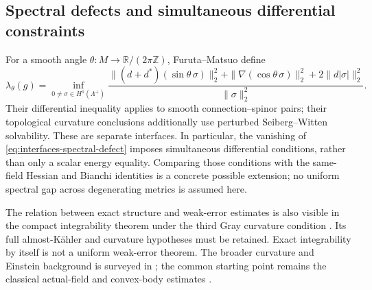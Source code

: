 \subsection{Spectral defects and simultaneous differential constraints}
For a smooth angle $\theta:M\to\mathbb R/(2\pi\mathbb Z)$,
Furuta--Matsuo define \cite[(8)]{FurutaMatsuo2016}
\begin{equation}\label{eq:interfaces-spectral-defect}
 \lambda_\theta(g)=
 \inf_{0\ne\sigma\in H^1(\Lambda^+)}
 \frac{\|(d+d^*)(\sin\theta\,\sigma)\|_2^2
       +\|\nabla(\cos\theta\,\sigma)\|_2^2
       +2\|d|\sigma|\|_2^2}{\|\sigma\|_2^2}.
\end{equation}
Their differential inequality applies to smooth connection--spinor
pairs; their topological curvature conclusions additionally use
perturbed Seiberg--Witten solvability. These are separate interfaces.
In particular, the vanishing of
\eqref{eq:interfaces-spectral-defect} imposes simultaneous differential
conditions, rather than only a scalar energy equality. Comparing those
conditions with the same-field Hessian and Bianchi identities is a
concrete possible extension; no uniform spectral gap across degenerating
metrics is assumed here.

The relation between exact structure and weak-error estimates is also
visible in the compact integrability theorem under the third Gray
curvature condition \cite{ApostolovArmstrongDraghici2002}. Its full
almost-K\"ahler and curvature hypotheses must be retained. Exact
integrability by itself is not a uniform weak-error theorem.
The broader curvature and Einstein background is surveyed in
\cite{LeBrunOverview2026}; the common starting point remains the
classical actual-field and convex-body estimates
\cite{LeBrun2001,LeBrunConvex}.

